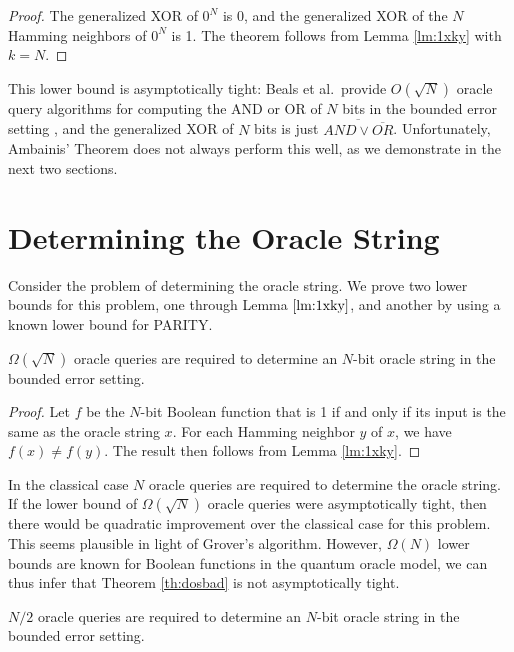 \begin{proof}
The generalized XOR of $0^{N}$ is $0$, and the generalized XOR of the
$N$ Hamming neighbors of $0^{N}$ is 1.  The theorem follows from Lemma
\ref{lm:1xky} with $k = N$.
\end{proof}

This lower bound is asymptotically tight: Beals et al.\ provide
$O(\sqrt{N})$ oracle query algorithms for computing the AND or OR of
$N$ bits in the bounded error setting \cite{beals98quantum}, and the
generalized XOR of $N$ bits is just $\overline{AND \vee
\overline{OR}}$.  Unfortunately, Ambainis' Theorem does not always 
perform this well, as we demonstrate in the next two sections.

\section{Determining the Oracle String}
\label{sec:dos}

Consider the problem of determining the oracle string.  We prove two
lower bounds for this problem, one through Lemma $\ref{lm:1xky}$, and
another by using a known lower bound for PARITY.

\begin{theorem}
\label{th:dosbad}
$\Omega(\sqrt{N})$ oracle queries are required to determine an $N$-bit
oracle string in the bounded error setting.
\end{theorem}

\begin{proof}
Let $f$ be the $N$-bit Boolean function that is 1 if and only if its
input is the same as the oracle string $x$.  For each Hamming neighbor
$y$ of $x$, we have $f(x) \neq f(y)$.  The result then follows from
Lemma \ref{lm:1xky}.
\end{proof}

In the classical case $N$ oracle queries are required to determine the
oracle string.  If the lower bound of $\Omega(\sqrt{N})$ oracle
queries were asymptotically tight, then there would be quadratic
improvement over the classical case for this problem.  This seems
plausible in light of Grover's algorithm.  However, $\Omega(N)$ lower
bounds are known for Boolean functions in the quantum oracle model, we
can thus infer that Theorem \ref{th:dosbad} is not asymptotically
tight.

\begin{theorem}
\label{th:dosgood}
$N/2$ oracle queries are required to determine an $N$-bit oracle
string in the bounded error setting.
\end{theorem}

